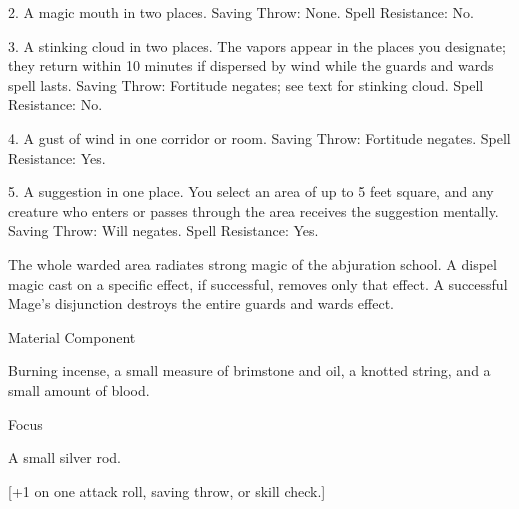 {	2. A magic mouth in two places. Saving Throw: None. Spell Resistance: No.


	3. A stinking cloud in two places. The vapors appear in the places you designate; they return within 10 minutes if dispersed by wind while the guards and wards spell lasts. Saving Throw: Fortitude negates; see text for stinking cloud. Spell Resistance: No.


	4. A gust of wind in one corridor or room. Saving Throw: Fortitude negates. Spell Resistance: Yes.


	5. A suggestion in one place. You select an area of up to 5 feet square, and any creature who enters or passes through the area receives the suggestion mentally. Saving Throw: Will negates. Spell Resistance: Yes.


	The whole warded area radiates strong magic of the abjuration school. A dispel magic cast on a specific effect, if successful, removes only that effect. A successful Mage's disjunction destroys the entire guards and wards effect.

Material Component

	Burning incense, a small measure of brimstone and oil, a knotted string, and a small amount of blood.

Focus

	A small silver rod.
}
        
[+1 on one attack roll, saving throw, or skill check.]
        
